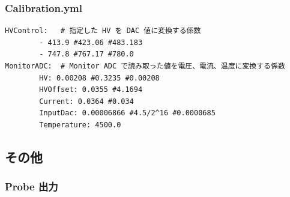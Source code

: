 \documentclass[a4paper]{report}
\begin{document}
\subsubsection{Calibration.yml}

\begin{shadebox}
\begin{verbatim}
HVControl:   # 指定した HV を DAC 値に変換する係数
        - 413.9 #423.06 #483.183
        - 747.8 #767.17 #780.0
MonitorADC:  # Monitor ADC で読み取った値を電圧、電流、温度に変換する係数
        HV: 0.00208 #0.3235 #0.00208
        HVOffset: 0.0355 #4.1694
        Current: 0.0364 #0.034
        InputDac: 0.00006866 #4.5/2^16 #0.0000685
        Temperature: 4500.0
\end{verbatim}
\end{shadebox}

\newpage
\subsection{その他}

\subsubsection{Probe 出力}
\end{document}
